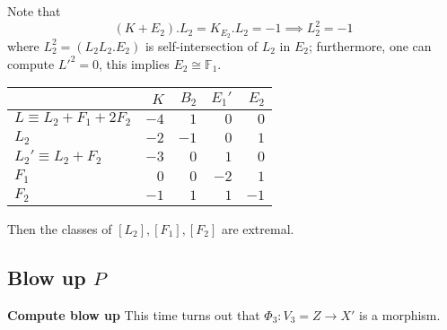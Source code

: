 \documentclass{article}
\begin{document}
Note that
\[ (K+E_2).L_2=K_{E_2}.L_2=-1 \implies L_2^2=-1\]
where $ L^2_2=(L_2L_2.E_2) $ is self-intersection of $ L_2 $ in $ E_2 $; furthermore, one can compute $ L'^2=0 $, this implies $ E_2\cong \mathbb{F}_1 $.
\begin{center}
	\begin{tabular}{l|rrrr}
		
		& $ K $ & $ B_2 $ &$ E_1' $ & $ E_2 $ \\
		\hline
		$ L\equiv L_2+F_1+2F_2 $ & $ -4 $ & $ 1 $ &$ 0 $&$ 0   $  \\
		
		$ L_2 $ & $ -2 $ & $ -1 $ &$ 0 $&$ 1 $  \\
		
		$ L_2'\equiv L_2+F_2 $ & $ -3 $ & $ 0 $ &$ 1 $&$ 0 $  \\
		
		$ F_1 $ & $ 0 $ & $ 0 $ &$ -2 $ &$ 1 $ \\
		
		$ F_2 $ & $ -1 $ & $ 1 $ & $ 1 $&$ -1 $ \\
		
	\end{tabular}
\end{center}
Then the classes of $ [L_2],[F_1],[F_2] $ are extremal. 
\subsection{Blow up $ P $}
\textbf{Compute blow up}
This time turns out that $ \Phi_3:V_3=Z\to X' $ is a morphism.
\end{document}
